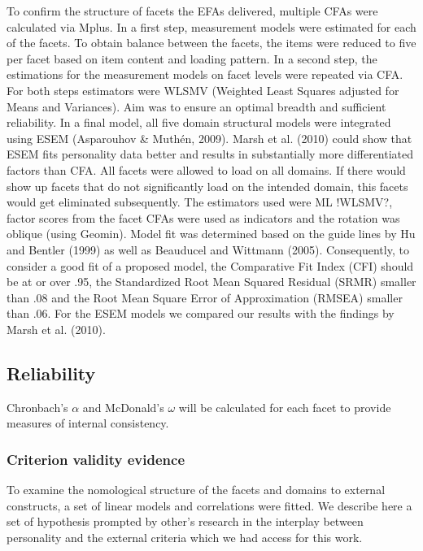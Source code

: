\documentclass[,man,floatsintext]{apa6}
\begin{document}
To confirm the structure of facets the EFAs delivered, multiple CFAs
were calculated via Mplus. In a first step, measurement models were
estimated for each of the facets. To obtain balance between the facets,
the items were reduced to five per facet based on item content and
loading pattern. In a second step, the estimations for the measurement
models on facet levels were repeated via CFA. For both steps estimators
were WLSMV (Weighted Least Squares adjusted for Means and Variances).
Aim was to ensure an optimal breadth and sufficient reliability. In a
final model, all five domain structural models were integrated using
ESEM (Asparouhov \& Muthén, 2009). Marsh et al. (2010) could show that
ESEM fits personality data better and results in substantially more
differentiated factors than CFA. All facets were allowed to load on all
domains. If there would show up facets that do not significantly load on
the intended domain, this facets would get eliminated subsequently. The
estimators used were ML !WLSMV?, factor scores from the facet CFAs were
used as indicators and the rotation was oblique (using Geomin). Model
fit was determined based on the guide lines by Hu and Bentler (1999) as
well as Beauducel and Wittmann (2005). Consequently, to consider a good
fit of a proposed model, the Comparative Fit Index (CFI) should be at or
over .95, the Standardized Root Mean Squared Residual (SRMR) smaller
than .08 and the Root Mean Square Error of Approximation (RMSEA) smaller
than .06. For the ESEM models we compared our results with the findings
by Marsh et al. (2010).

\subsection{Reliability}\label{reliability}

Chronbach's \(\alpha\) and McDonald's \(\omega\) will be calculated for
each facet to provide measures of internal consistency.

\subsubsection{Criterion validity
evidence}\label{criterion-validity-evidence}

To examine the nomological structure of the facets and domains to
external constructs, a set of linear models and correlations were
fitted. We describe here a set of hypothesis prompted by other's
research in the interplay between personality and the external criteria
which we had access for this work.
\end{document}
